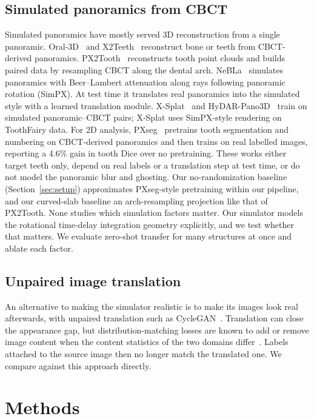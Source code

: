 \documentclass[preprint,12pt]{elsarticle}
\begin{document}
\subsection{Simulated panoramics from CBCT}
Simulated panoramics have mostly served 3D reconstruction from a single panoramic. Oral-3D~\cite{song2021} and
X2Teeth~\cite{liang2021} reconstruct bone or teeth from CBCT-derived panoramics. PX2Tooth~\cite{ma2024} reconstructs
tooth point clouds and builds paired data by resampling CBCT along the dental arch. NeBLa~\cite{park2024} simulates
panoramics with Beer--Lambert attenuation along rays following panoramic rotation (SimPX). At test time it translates
real panoramics into the simulated style with a learned translation module. X-Splat~\cite{szczepanski2026} and
HyDAR-Pano3D~\cite{yue2026} train on simulated panoramic--CBCT pairs; X-Splat uses SimPX-style rendering on ToothFairy
data. For 2D analysis, PXseg~\cite{wang2025} pretrains tooth segmentation and numbering on CBCT-derived panoramics and
then trains on real labelled images, reporting a 4.6\% gain in tooth Dice over no pretraining. These works either target
teeth only, depend on real labels or a translation step at test time, or do not model the panoramic blur and ghosting.
Our no-randomization baseline (Section~\ref{sec:setup}) approximates PXseg-style pretraining within our pipeline, and
our curved-slab baseline an arch-resampling projection like that of PX2Tooth. None studies which simulation factors
matter. Our simulator models the rotational time-delay integration geometry explicitly, and we test whether that matters.
We evaluate zero-shot transfer for many structures at once and ablate each factor.

\subsection{Unpaired image translation}
An alternative to making the simulator realistic is to make its images look real afterwards, with unpaired translation
such as CycleGAN~\cite{zhu2017}. Translation can close the appearance gap, but distribution-matching losses are known to
add or remove image content when the content statistics of the two domains differ~\cite{cohen2018}. Labels attached to
the source image then no longer match the translated one. We compare against this approach directly.

\section{Methods}
\end{document}

